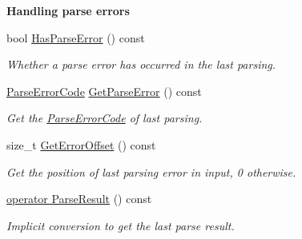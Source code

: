 \begin{Indent}\textbf{ Handling parse errors}\par
\begin{DoxyCompactItemize}
\item 
bool \hyperlink{classGenericDocument_a510a0588db4eb372f5d81bc3646578fb}{Has\+Parse\+Error} () const
\begin{DoxyCompactList}\small\item\em Whether a parse error has occurred in the last parsing. \end{DoxyCompactList}\item 
\hyperlink{group__RAPIDJSON__ERRORS_ga8d4b32dfc45840bca189ade2bbcb6ba7}{Parse\+Error\+Code} \hyperlink{classGenericDocument_a9400a5bd3169cc6ed545e681ccc06070}{Get\+Parse\+Error} () const
\begin{DoxyCompactList}\small\item\em Get the \hyperlink{group__RAPIDJSON__ERRORS_ga8d4b32dfc45840bca189ade2bbcb6ba7}{Parse\+Error\+Code} of last parsing. \end{DoxyCompactList}\item 
size\+\_\+t \hyperlink{classGenericDocument_ae1ef7ca99ced428e9300c68e5142afdb}{Get\+Error\+Offset} () const
\begin{DoxyCompactList}\small\item\em Get the position of last parsing error in input, 0 otherwise. \end{DoxyCompactList}\item 
\hyperlink{classGenericDocument_af9bb8eade3eae0c039161378e8d2923a}{operator Parse\+Result} () const
\begin{DoxyCompactList}\small\item\em Implicit conversion to get the last parse result. \end{DoxyCompactList}\end{DoxyCompactItemize}
\end{Indent}
